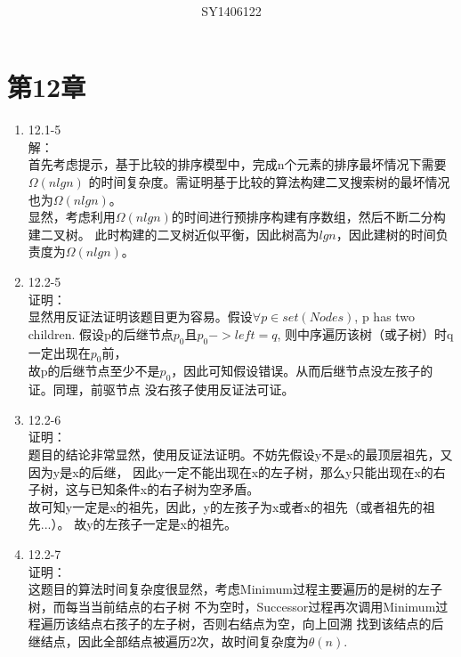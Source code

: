 \documentclass[UTF8]{ctexart}
\begin{document}
\title{\\}
\vspace{2cm}
\author{\\SY1406122}
\date{}
\maketitle

\section*{第12章}
\begin{enumerate}
    \item 12.1-5 \\
    解：\\
        首先考虑提示，基于比较的排序模型中，完成n个元素的排序最坏情况下需要$\Omega(nlgn)$
		的时间复杂度。需证明基于比较的算法构建二叉搜索树的最坏情况也为$\Omega(nlgn)$。\\
		显然，考虑利用$\Omega(nlgn)$的时间进行预排序构建有序数组，然后不断二分构建二叉树。
		此时构建的二叉树近似平衡，因此树高为$lgn$，因此建树的时间负责度为$\Omega(nlgn)$。
	
	\item 12.2-5 \\
	证明：\\
		显然用反证法证明该题目更为容易。假设$\forall p \in set(Nodes)$, p has two children.
		假设p的后继节点$p_0$且$p_0->left = q$, 则中序遍历该树（或子树）时q一定出现在$p_0$前，\\
		故p的后继节点至少不是$p_0$，因此可知假设错误。从而后继节点没左孩子的证。同理，前驱节点
		没右孩子使用反证法可证。

	\item 12.2-6 \\
	证明：\\
		题目的结论非常显然，使用反证法证明。不妨先假设y不是x的最顶层祖先，又因为y是x的后继，
		因此y一定不能出现在x的左子树，那么y只能出现在x的右子树，这与已知条件x的右子树为空矛盾。\\
		故可知y一定是x的祖先，因此，y的左孩子为x或者x的祖先（或者祖先的祖先...）。
		故y的左孩子一定是x的祖先。
		
	\item 12.2-7 \\
	证明：\\
		这题目的算法时间复杂度很显然，考虑Minimum过程主要遍历的是树的左子树，而每当当前结点的右子树
		不为空时，Successor过程再次调用Minimum过程遍历该结点右孩子的左子树，否则右结点为空，向上回溯
		找到该结点的后继结点，因此全部结点被遍历2次，故时间复杂度为$\theta(n)$.
		

\end{enumerate}
\end{document}

